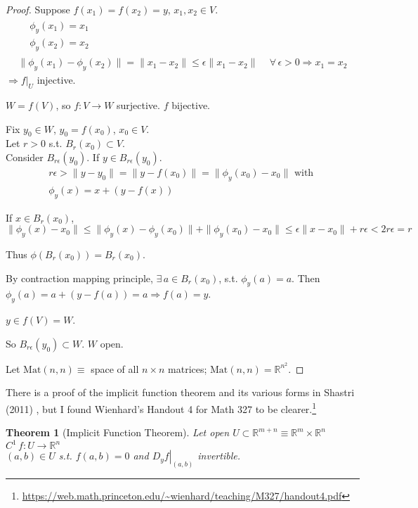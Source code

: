 \documentclass[10pt]{amsart}
\newtheorem{theorem}{Theorem}
\begin{document}
\begin{multicols*}{2}
\begin{proof}
Suppose $f(x_1) = f(x_2)=y$, $x_1,x_2 \in V$.  
\[
\begin{gathered}
\begin{aligned}
  & \phi_y(x_1) =x_1 \\ 
  & \phi_y(x_2) =x_2  
\end{aligned} \\
\| \phi_y(x_1) - \phi_y(x_2) \| = \| x_1 - x_2 \| \leq \epsilon \| x_1 - x_2 \| \quad \, \forall \, \epsilon > 0 \Longrightarrow x_1 = x_2 
\end{gathered}
\]
$\Longrightarrow \left. f\right|_U$ injective.

$W=f(V)$, so $f:V\to W$ surjective.  $f$ bijective.  

Fix $y_0 \in W$, $y_0 = f(x_0)$, $x_0 \in V$.  \\
Let $r>0$ s.t. $B_r(x_0) \subset V$.  \\
Consider $B_{r\epsilon}(y_0)$.  If $y\in B_{r\epsilon}(y_0)$.  
\[
\begin{gathered}
  r\epsilon > \| y-y_0 \| = \| y - f(x_0) \| = \| \phi_y(x_0) - x_0 \| \text{ with } \\
  \phi_y(x) = x + (y-f(x))
\end{gathered}
\]

If $x\in B_r(x_0)$, 
\[
\| \phi_y(x) -x_0 \| \leq \| \phi_y(x) - \phi_y(x_0) \|  + \| \phi_y(x_0) - x_0 \| \leq \epsilon \| x-x_0 \| + r\epsilon < 2 r\epsilon = r
\]


Thus $\phi(B_r(x_0)) = B_r(x_0)$.

By contraction mapping principle, $\exists \, a \in B_r(x_0)$, s.t. $\phi_y(a)=a$.  Then $\phi_y(a) = a+ (y-f(a)) = a \Longrightarrow f(a) =y$.  

$y\in f(V) = W$.  

So $B_{r\epsilon}(y_0) \subset W$.  $W$ open.  

Let $\text{Mat}(n,n) \equiv $ space of all $n\times n$ matrices; $\text{Mat}(n,n)  = \mathbb{R}^{n^2}$.  


\end{proof}

There is a proof of the implicit function theorem and its various forms in Shastri (2011) \cite{AShastri2011}, but I found Wienhard's Handout 4 for Math 327 to be clearer.\footnote{\url{https://web.math.princeton.edu/~wienhard/teaching/M327/handout4.pdf}}

\begin{theorem}[Implicit Function Theorem]
Let open $U \subset \mathbb{R}^{m+n} \equiv \mathbb{R}^m \times \mathbb{R}^n$  \\
\phantom{Let} $C^1 \, f:U \to \mathbb{R}^n $ \\
\phantom{Let} $(a,b) \in U$ s.t. $f(a,b) = 0$ and $\left. D_y f\right|_{(a,b)}$ invertible.  


\end{theorem}
\end{multicols*}
\end{document}
